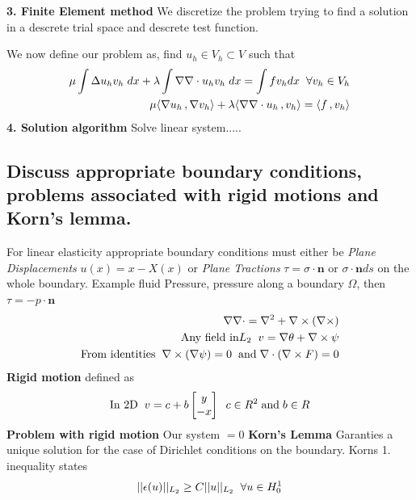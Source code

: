 \documentclass[a4paper,norsk]{article}
\begin{document}
\textbf{3. Finite Element method} We discretize the problem trying to find a solution in a descrete trial space and descrete test function.

We now define our problem as, find $u_h \in V_h \subset V$ such that
\begin{align*}
\mu \int \Delta u_h v_h \hspace{1mm} dx + \lambda \int \nabla \nabla \cdot u_h v_h \hspace{1mm} dx = \int f v_h dx \hspace{2mm} \forall v_h \in V_h \\ 
\mu \langle \nabla u_h \,, \nabla v_h \rangle + \lambda \langle \nabla \nabla \cdot u_h \,, v_h \rangle = \langle f \,, v_h \rangle
\end{align*}
\textbf{4. Solution algorithm} Solve linear system.....

\subsection*{Discuss appropriate boundary conditions, problems associated with rigid motions and Korn's lemma.}  
For linear elasticity appropriate boundary conditions must either be \textit{Plane Displacements} $u(x) = x - X(x)$ 
or \textit{Plane Tractions} $\tau = \sigma \cdot \textbf{n}$ or $\sigma \cdot \textbf{n} ds$ on the whole boundary. 
Example fluid Pressure, pressure along a boundary $\Omega$, then $\tau = -p\cdot \textbf{n}$
\begin{align*}
\nabla \nabla \cdot = \nabla^2 + \nabla \times (\nabla \times) \\
\text{Any field in} L_2 \hspace{2mm} v = \nabla \theta + \nabla \times \psi \\
\text{From identities} \hspace{2mm} \nabla \times (\nabla \psi) = 0 \hspace{2mm} \text{and} \hspace{1mm} \nabla \cdot ( \nabla \times F) = 0
\end{align*}
\textbf{Rigid motion} defined as 
\begin{align*}
\text{In 2D} \hspace{2mm} v = c + b 
   \begin{bmatrix}
         y \\
         -x
        \end{bmatrix}
        \hspace{2mm} c \in R^2 \hspace{1mm} \text{and} \hspace{1mm} b \in R
\end{align*}
\textbf{Problem with rigid motion} Our system $= 0$ \newline
\textbf{Korn's Lemma} \newline
Garanties a unique solution for the case of Dirichlet conditions on the boundary. Korns 1. inequality states
\begin{align*}
||\epsilon(u)||_{L_2} \geq C ||u||_{L_2} \hspace{2mm} \forall u \in H_0^1 
\end{align*}
\end{document}
